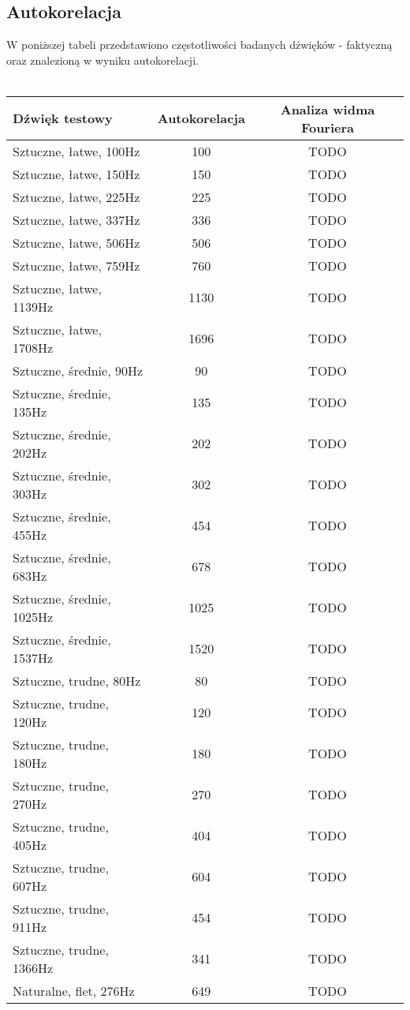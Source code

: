 \documentclass{classrep}
\begin{document}
\subsection{Autokorelacja}
W poniższej tabeli przedstawiono częstotliwości badanych dźwięków - faktyczną oraz znalezioną w wyniku autokorelacji.\\
\\
\begin{tabular}{ l | c | c }
  \hline
  Dźwięk testowy & Autokorelacja & Analiza widma Fouriera \\
  \hline			
  Sztuczne, łatwe, 100Hz & 100 & TODO \\
  Sztuczne, łatwe, 150Hz & 150 & TODO \\
  Sztuczne, łatwe, 225Hz & 225 & TODO \\
  Sztuczne, łatwe, 337Hz & 336 & TODO \\
  Sztuczne, łatwe, 506Hz & 506 & TODO \\
  Sztuczne, łatwe, 759Hz & 760 & TODO \\
  Sztuczne, łatwe, 1139Hz & 1130 & TODO \\
  Sztuczne, łatwe, 1708Hz & 1696 & TODO \\
  \hline
  Sztuczne, średnie, 90Hz & 90 & TODO \\
  Sztuczne, średnie, 135Hz & 135 & TODO \\
  Sztuczne, średnie, 202Hz & 202 & TODO \\
  Sztuczne, średnie, 303Hz & 302 & TODO \\
  Sztuczne, średnie, 455Hz & 454 & TODO \\
  Sztuczne, średnie, 683Hz & 678 & TODO \\
  Sztuczne, średnie, 1025Hz & 1025 & TODO \\
  Sztuczne, średnie, 1537Hz & 1520 & TODO \\
  \hline 
  Sztuczne, trudne, 80Hz & 80 & TODO \\
  Sztuczne, trudne, 120Hz & 120 & TODO \\
  Sztuczne, trudne, 180Hz & 180 & TODO \\
  Sztuczne, trudne, 270Hz & 270 & TODO \\
  Sztuczne, trudne, 405Hz & 404 & TODO \\
  Sztuczne, trudne, 607Hz & 604 & TODO \\
  Sztuczne, trudne, 911Hz & 454 & TODO \\
  Sztuczne, trudne, 1366Hz & 341 & TODO \\
  \hline 
  Naturalne, flet, 276Hz & 649 & TODO \\

\end{tabular}
\end{document}
